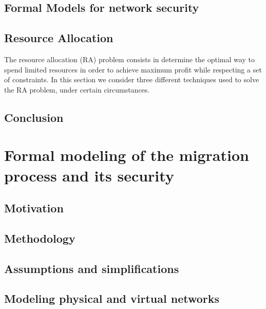 \documentclass[a4paper, 11pt]{article}
\begin{document}


\subsection{Formal Models for network security}



\subsection{Resource Allocation}
The resource allocation (RA) problem consists in determine the optimal way to spend limited resources in order to achieve maximum profit while respecting a set of constraints.
In this section we consider three different techniques used to solve the RA problem, under certain circumstances. 






\subsection{Conclusion}


\newpage
\section{Formal modeling of the migration process and its security}
\label{sec:formal_model}
\subsection{Motivation}


\subsection{Methodology}


\subsection{Assumptions and simplifications}


\subsection{Modeling physical and virtual networks}

\end{document}
